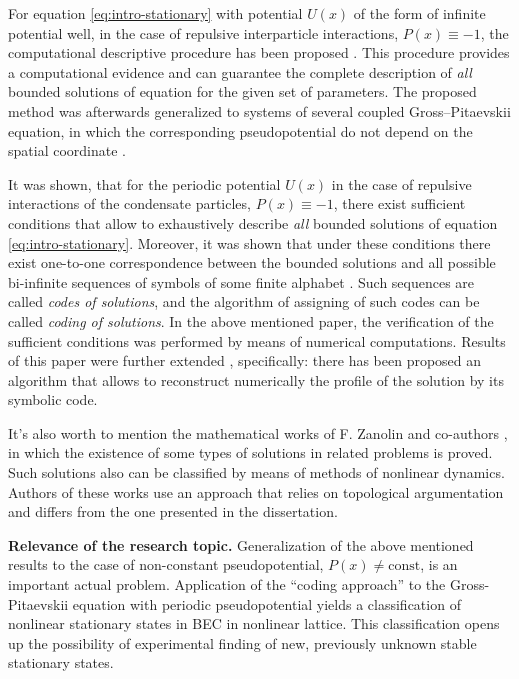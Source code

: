 For equation \eqref{eq:intro-stationary} with potential $U(x)$ of the form of infinite potential well, in the case of repulsive interparticle interactions, $P(x) \equiv -1$, the computational descriptive procedure has been proposed \cite{AlfimovZezyulin}.
This procedure provides a computational evidence and can guarantee the complete description of {\it all} bounded solutions of equation for the given set of parameters.
The proposed method was afterwards generalized to systems of several coupled Gross--Pitaevskii equation, in which the corresponding pseudopotential do not depend on the spatial coordinate \cite{AlfimovBarashenkovFedotovSmirnovZezyulin}.

It was shown, that for the periodic potential $U(x)$ in the case of repulsive interactions of the condensate particles, $P(x) \equiv -1$, there exist sufficient conditions that allow to exhaustively describe {\it all} bounded solutions of equation \eqref{eq:intro-stationary}.
Moreover, it was shown that under these conditions there exist one-to-one correspondence between the bounded solutions and all possible bi-infinite sequences of symbols of some finite alphabet \cite{AlfimovAvramenko}.
Such sequences are called {\it codes of solutions}, and the algorithm of assigning of such codes can be called {\it coding of solutions}.
In the above mentioned paper, the verification of the sufficient conditions was performed by means of numerical computations.
Results of this paper were further extended \cite{AlfimovKizinZezyulin}, specifically: there has been proposed an algorithm that allows to reconstruct numerically the profile of the solution by its symbolic code.

It's also worth to mention the mathematical works of F. Zanolin and co-authors \cite{ZaniniZanolin2018, ZaniniZanolin2012}, in which the existence of some types of solutions in related problems is proved.
Such solutions also can be classified by means of methods of nonlinear dynamics.
Authors of these works use an approach that relies on topological argumentation and differs from the one presented in the dissertation.

\textbf{Relevance of the research topic.}
Generalization of the above mentioned results to the case of non-constant pseudopotential, $P(x) \neq \mathrm{const}$, is an important actual problem.
Application of the ``coding approach'' to the Gross-Pitaevskii equation with periodic pseudopotential yields  a classification of nonlinear stationary states in BEC in nonlinear lattice.
This classification opens up the possibility of experimental finding of new, previously unknown stable stationary states.

